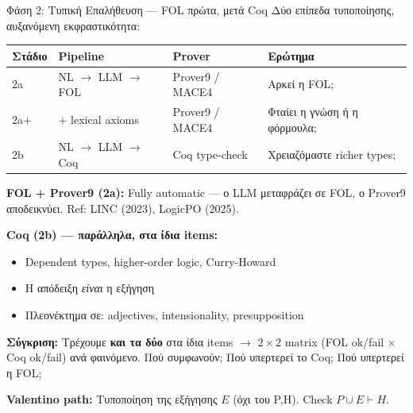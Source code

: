 \documentclass[aspectratio=169,10pt]{beamer}
\begin{document}
\begin{frame}{Φάση 2: Τυπική Επαλήθευση --- FOL πρώτα, μετά Coq}
	Δύο επίπεδα τυποποίησης, αυξανόμενη εκφραστικότητα:

	\vspace{0.2cm}
	\begin{center}
		\footnotesize
		\begin{tabular}{l l l l}
			\toprule
			\textbf{Στάδιο} & \textbf{Pipeline} & \textbf{Prover} & \textbf{Ερώτημα} \\
			\midrule
			2a & NL $\to$ LLM $\to$ FOL & Prover9 / MACE4 & Αρκεί η FOL; \\
			2a+ & $+$ lexical axioms & Prover9 / MACE4 & Φταίει η γνώση ή η φόρμουλα; \\
			2b & NL $\to$ LLM $\to$ Coq & Coq type-check & Χρειαζόμαστε richer types; \\
			\bottomrule
		\end{tabular}
	\end{center}

	\vspace{0.2cm}
	\textbf{FOL + Prover9 (2a):} Fully automatic --- ο LLM μεταφράζει σε FOL, ο Prover9 αποδεικνύει. Ref: LINC (2023), LogicPO (2025).

	\vspace{0.2cm}
	\textbf{Coq (2b) --- παράλληλα, στα ίδια items:}
	\begin{itemize}
		\item Dependent types, higher-order logic, Curry-Howard
		\item Η απόδειξη \textit{είναι} η εξήγηση
		\item Πλεονέκτημα σε: adjectives, intensionality, presupposition
	\end{itemize}

	\vspace{0.2cm}
	\textbf{Σύγκριση:} Τρέχουμε \textbf{και τα δύο} στα ίδια items $\to$ $2 \times 2$ matrix (FOL ok/fail $\times$ Coq ok/fail) ανά φαινόμενο. Πού συμφωνούν; Πού υπερτερεί το Coq; Πού υπερτερεί η FOL;

	\vspace{0.2cm}
	\textbf{Valentino path:} Τυποποίηση της εξήγησης $E$ (όχι του P,H). Check $P \cup E \vdash H$.
\end{frame}
\end{document}
